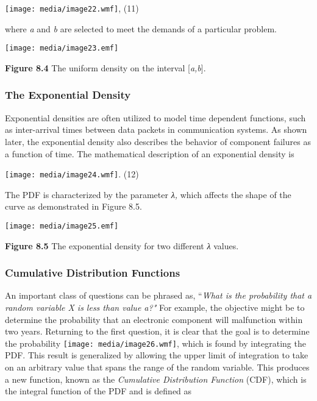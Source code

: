 \texttt{[image: media/image22.wmf]}, (11)

where \emph{a} and \emph{b} are selected to meet the demands of a
particular problem.

\texttt{[image: media/image23.emf]}

\textbf{Figure 8.4} The uniform density on the interval
{[}\emph{a,b}{]}.

\subsubsection*{The Exponential Density}\label{the-exponential-density}

Exponential densities are often utilized to model time dependent
functions, such as inter-arrival times between data packets in
communication systems. As shown later, the exponential density also
describes the behavior of component failures as a function of time. The
mathematical description of an exponential density is

\texttt{[image: media/image24.wmf]}. (12)

The PDF is characterized by the parameter \emph{λ,} which affects the
shape of the curve as demonstrated in Figure 8.5.

\texttt{[image: media/image25.emf]}

\textbf{Figure 8.5} The exponential density for two different \emph{λ}
values.

\subsubsection{Cumulative Distribution
Functions}\label{cumulative-distribution-functions}

An important class of questions can be phrased as, ``\emph{What is the
probability that a random variable X is less than value a?"} For
example, the objective might be to determine the probability that an
electronic component will malfunction within two years. Returning to the
first question, it is clear that the goal is to determine the
probability \texttt{[image: media/image26.wmf]}, which is found by
integrating the PDF. This result is generalized by allowing the upper
limit of integration to take on an arbitrary value that spans the range
of the random variable. This produces a new function, known as the
\emph{Cumulative Distribution Function} (CDF), which is the integral
function of the PDF and is defined as

